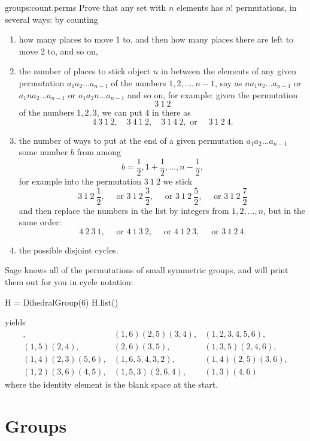 \begin{problem}{groups:count.perms}
Prove that any set with \(n\) elements has \(n!\) permutations, in several ways: by counting 
\begin{enumerate}
\item how many places to move \(1\) to, and then how many places there are left to move \(2\) to, and so on,
\item the number of places to stick object \(n\) in between the elements of any given permutation \(a_1 a_2 \dots a_{n-1}\) of the numbers \(1,2,\dots,n-1\), say as \(n a_1 a_2 \dots a_{n-1}\) or \(a_1 n a_2 \dots a_{n-1}\) or \(a_1 a_2 n \dots a_{n-1}\) and so on, for example: given the permutation
\[
3 \ 1 \ 2
\]
of the numbers \(1,2,3\), we can put \(4\) in there as
\[
4 \ 3 \ 1 \ 2, \quad 3 \ 4 \ 1 \ 2, \quad 3 \ 1 \ 4 \ 2, \text{ or } \quad 3 \ 1 \ 2 \ 4.
\]
\item the number of ways to put at the end of a given permutation \(a_1 a_2 \dots a_{n-1}\) some number \(b\) from among 
\[
b=\frac{1}{2}, 1+\frac{1}{2}, \dots, n-\frac{1}{2},
\]
for example into the permutation \(3 \ 1 \ 2\) we stick
\[
3 \ 1 \ 2 \ \frac{1}{2}, \quad \text{ or }
3 \ 1 \ 2 \ \frac{3}{2}, \quad \text{ or }
3 \ 1 \ 2 \ \frac{5}{2}, \quad \text{ or }
3 \ 1 \ 2 \ \frac{7}{2}
\]
and then replace the numbers in the list by integers from \(1,2,\dots,n\), but in the same order:
\[
4 \ 2 \ 3 \ 1, \quad \text{ or }
4 \ 1 \ 3 \ 2, \quad \text{ or }
4 \ 1 \ 2 \ 3, \quad \text{ or }
3 \ 1 \ 2 \ 4.
\]
\item
the possible disjoint cycles.
\end{enumerate}
\end{problem}


Sage knows all of the permutations of small symmetric groups, and will print them out for you in cycle notation:
\begin{sageblock}
H = DihedralGroup(6)
H.list()
\end{sageblock}
yields
\[
\begin{array}{lll}
               , & (1,6)(2,5)(3,4), & (1,2,3,4,5,6), \\ 
     (1,5)(2,4), & (2,6)(3,5),      & (1,3,5)(2,4,6), \\ 
(1,4)(2,3)(5,6), & (1,6,5,4,3,2),   & (1,4)(2,5)(3,6), \\ 
(1,2)(3,6)(4,5), & (1,5,3)(2,6,4),  & (1,3)(4,6)
\end{array}
\]
where the identity element is the blank space at the start.

\section{Groups}

